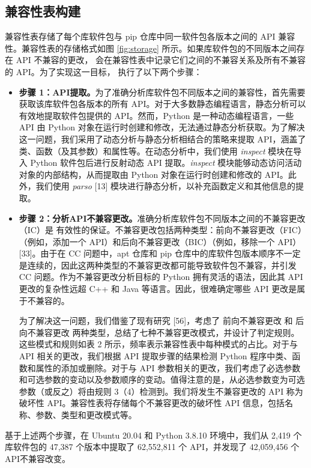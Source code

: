 \subsection{兼容性表构建}\label{4.1.3}
兼容性表存储了每个库软件包与 pip 仓库中同一软件包各版本之间的 API 兼容性。兼容性表的存储格式如图 \ref{fig:storage} 所示。如果库软件包的不同版本之间存在 API 不兼容的更改，\tool{} 会在兼容性表中记录它们之间的不兼容关系及所有不兼容的 API。为了实现这一目标，\tool{} 执行了以下两个步骤：
\begin{itemize}
	\item \textbf{步骤 1：API提取。}为了准确分析库软件包不同版本之间的兼容性，首先需要获取该库软件包各版本的所有 API。对于大多数静态编程语言，静态分析可以有效地提取软件包提供的 API。然而，Python 是一种动态编程语言，一些 API 由 Python 对象在运行时创建和修改，无法通过静态分析获取。为了解决这一问题，我们采用了动态分析与静态分析相结合的策略来提取 API，涵盖了类、函数（及其参数）和属性等。在动态分析中，我们使用 \textit{inspect} 模块在导入 Python 软件包后进行反射动态 API 提取。\textit{inspect} 模块能够动态访问活动对象的内部结构，从而提取由 Python 对象在运行时创建和修改的 API。此外，我们使用 \textit{parso} [13] 模块进行静态分析，以补充函数定义和其他信息的提取。
	
	\item \textbf{步骤 2：分析API不兼容更改。}准确分析库软件包不同版本之间的不兼容更改（IC）是 \tool{}有效性的保证。不兼容更改包括两种类型：前向不兼容更改（FIC）（例如，添加一个 API）和后向不兼容更改（BIC）（例如，移除一个 API）[33]。由于在 CC 问题中，apt 仓库和 pip 仓库中的库软件包版本顺序不一定是连续的，因此这两种类型的不兼容更改都可能导致软件包不兼容，并引发 CC 问题。作为不兼容更改分析目标的 Python 拥有灵活的语法，因此其 API 更改的复杂性远超 C++ 和 Java 等语言。因此，很难确定哪些 API 更改是属于不兼容的。
	
	为了解决这一问题，我们借鉴了现有研究 [56]，考虑了 前向不兼容更改 和 后向不兼容更改 两种类型，总结了七种不兼容更改模式，并设计了判定规则。这些模式和规则如表 2 所示，频率表示兼容性表中每种模式的占比。对于与 API 相关的更改，我们根据 API 提取步骤的结果检测 Python 程序中类、函数和属性的添加或删除。对于与 API 参数相关的更改，我们考虑了必选参数和可选参数的变动以及参数顺序的变动。值得注意的是，从必选参数变为可选参数（或反之）将由规则 3（4）检测到。我们将发生不兼容更改的 API 称为破坏性 API。兼容性表将存储每个不兼容更改的破坏性 API 信息，包括名称、参数、类型和更改模式等。

\end{itemize}

基于上述两个步骤，在 Ubuntu 20.04 和 Python 3.8.10 环境中，我们从 2,419 个库软件包的 47,387 个版本中提取了 62,552,811 个 API，并发现了 42,059,456 个API不兼容改变。


